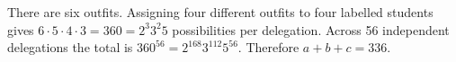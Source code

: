 There are six outfits. Assigning four different outfits to four labelled students gives $6\cdot5\cdot4\cdot3=360=2^3 3^2 5$ possibilities per delegation. Across 56 independent delegations the total is $360^{56}=2^{168}3^{112}5^{56}$. Therefore $\boxed{a+b+c=336}$.
